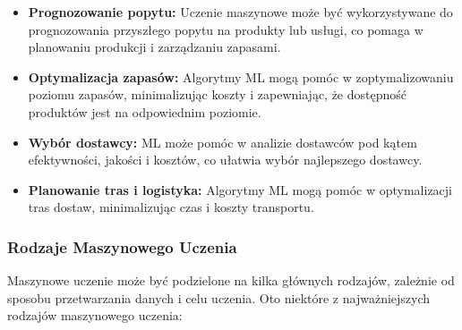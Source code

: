 \begin{itemize}
    \item \textbf{Prognozowanie popytu:} Uczenie maszynowe może być wykorzystywane do prognozowania przyszłego popytu na produkty lub usługi, co pomaga w planowaniu produkcji i zarządzaniu zapasami.
    
    \item \textbf{Optymalizacja zapasów:} Algorytmy ML mogą pomóc w zoptymalizowaniu poziomu zapasów, minimalizując koszty i zapewniając, że dostępność produktów jest na odpowiednim poziomie.
    
    \item \textbf{Wybór dostawcy:} ML może pomóc w analizie dostawców pod kątem efektywności, jakości i kosztów, co ułatwia wybór najlepszego dostawcy.
    
    \item \textbf{Planowanie tras i logistyka:} Algorytmy ML mogą pomóc w optymalizacji tras dostaw, minimalizując czas i koszty transportu.
\end{itemize}

\subsubsection{Rodzaje Maszynowego Uczenia}

Maszynowe uczenie może być podzielone na kilka głównych rodzajów, zależnie od sposobu przetwarzania danych i celu uczenia. Oto niektóre z najważniejszych rodzajów maszynowego uczenia:

